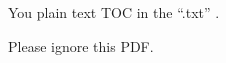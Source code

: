 \documentclass{article}
\begin{document}
\centering \huge
You plain text TOC in the ``\toc.txt'' .

Please ignore this PDF.

\tiny

\end{document}
